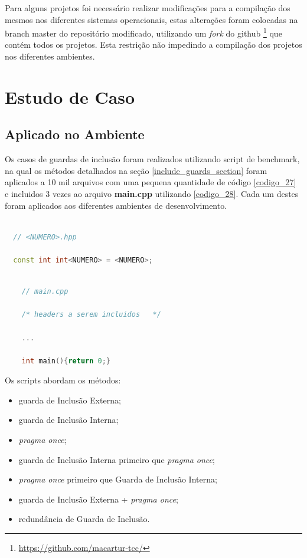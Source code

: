     Para alguns projetos foi necessário realizar modificações para a compilação
 dos mesmos nos diferentes sistemas operacionais,
estas alterações foram colocadas na branch master do repositório modificado,
utilizando um \textit{fork} do github
\footnote{\url{https://github.com/macartur-tcc/}} que contém todos os projetos.
 Esta restrição não impedindo a compilação dos projetos nos diferentes ambientes.

\section {Estudo de Caso}

\subsection{Aplicado no Ambiente}

Os casos de guardas de inclusão foram realizados utilizando script de benchmark,
 na qual os métodos detalhados na seção \ref{include_guards_section} foram
 aplicados a 10 mil arquivos com uma pequena quantidade de código
 \ref{codigo_27} e incluidos 3 vezes ao arquivo \textbf{main.cpp} utilizando
 \ref{codigo_28}. Cada um destes foram aplicados aos diferentes ambientes de
 desenvolvimento.

\begin{lstlisting}[language=C++,caption={Template de arquivo .hpp utilizado no benchmark},
                                                   label=codigo_27]

  // <NUMERO>.hpp

  const int int<NUMERO> = <NUMERO>;

\end{lstlisting}

\begin{lstlisting}[language=C++,caption={Template de arquivo main.cpp utilizado no benchmark},
                                                          label=codigo_28]

    // main.cpp

    /* headers a serem incluidos   */

    ...

    int main(){return 0;}
\end{lstlisting}

Os scripts abordam os métodos:

\begin{itemize}
	\item guarda de Inclusão Externa;
	\item guarda de Inclusão Interna;
	\item \textit{pragma once};
	\item guarda de Inclusão Interna primeiro que \textit{pragma once};
	\item \textit{pragma once} primeiro que  Guarda de Inclusão Interna;
	\item guarda de Inclusão Externa + \textit{pragma once};
	\item redundância de Guarda de Inclusão.
\end{itemize}

